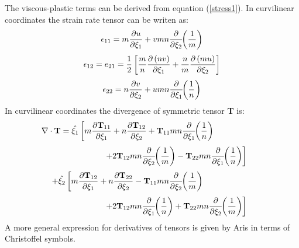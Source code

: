 The viscous-plastic terms can be derived from equation
(\ref{stress1}).  In curvilinear coordinates the strain rate tensor
can be writen as:
\begin{equation}
   \epsilon_{11} = m {\partial u \over \partial \xi_1} +
    vmn {\partial \over \partial \xi_2} \!\! \left( {1 \over m} \right)
\end{equation}
\begin{equation}
   \epsilon_{12} = e_{21} = {1 \over 2} \left[
   {m \over n} {\partial \left( nv \right) \over \partial \xi_1}
   + {n \over m} {\partial \left( mu \right) \over \partial \xi_2}
   \right]
\end{equation}
\begin{equation}
   \epsilon_{22} = n {\partial v \over \partial \xi_2} +
    umn {\partial \over \partial \xi_1} \!\! \left( {1 \over n} \right)
\end{equation}
In curvilinear coordinates the divergence of symmetric tensor {\bf T}
is:
\[
    \nabla \cdot \mbox{\bf T} =
    \hat{\xi_1} \left[ m
    {\partial \mbox{\bf T}_{11} \over \partial \xi_1}
    + n {\partial \mbox{\bf T}_{12} \over \partial \xi_2}
    + \mbox{\bf T}_{11} mn {\partial \over \partial \xi_1} \!\!
    \left( {1 \over n} \right) \right. \mbox{\hspace{2 cm}}
\]
\[
    \mbox{\hspace{2 cm}} \left. + 2 \mbox{\bf T}_{12} mn
    {\partial \over \partial \xi_2} \!\! \left( {1 \over m} \right)
    - \mbox{\bf T}_{22} mn
    {\partial \over \partial \xi_1} \!\! \left( {1 \over n} \right)
    \right]
\]
\[
    + \hat{\xi_2} \left[ m
    {\partial \mbox{\bf T}_{12} \over \partial \xi_1}
    + n {\partial \mbox{\bf T}_{22} \over \partial \xi_2}
    - \mbox{\bf T}_{11} mn {\partial \over \partial \xi_2} \!\!
    \left( {1 \over m} \right) \right. \mbox{\hspace{2 cm}}
\]
\begin{equation}
    \mbox{\hspace{2 cm}} \left. + 2 \mbox{\bf T}_{12} mn
    {\partial \over \partial \xi_1} \!\! \left( {1 \over n} \right)
    + \mbox{\bf T}_{22} mn
    {\partial \over \partial \xi_2} \!\! \left( {1 \over m} \right)
    \right]
\end{equation}
A more general expression for derivatives of tensors is given by
Aris \cite{Aris} in terms of Christoffel symbols.

